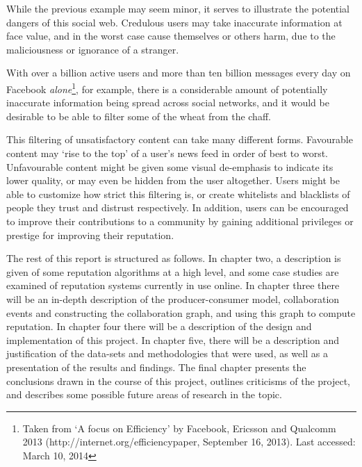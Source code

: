 \documentclass[]{final_report}
\begin{document}
While the previous example may seem minor, it serves to illustrate the potential dangers of this social web. Credulous users may take inaccurate information at face value, and in the worst case cause themselves or others harm, due to the maliciousness or ignorance of a stranger.


With over a billion active users and more than ten billion messages every day on Facebook \textsl{alone}\footnote{Taken from `A focus on Efficiency' by Facebook, Ericsson and Qualcomm 2013 (http://internet.org/efficiencypaper, September 16, 2013). Last accessed: March 10, 2014}, for example, there is a considerable amount of potentially inaccurate information being spread across social networks, and it would be desirable to be able to filter some of the wheat from the chaff.

This filtering of unsatisfactory content can take many different forms. Favourable content may `rise to the top' of a user's news feed in order of best to worst. Unfavourable content might be given some visual de-emphasis to indicate its lower quality, or may even be hidden from the user altogether. Users might be able to customize how strict this filtering is, or create whitelists and blacklists of people they trust and distrust respectively. In addition, users can be encouraged to improve their contributions to a community by gaining additional privileges or prestige for improving their reputation.

The rest of this report is structured as follows. In chapter two, a description is given of some reputation algorithms at a high level, and some case studies are examined of reputation systems currently in use online. In chapter three there will be an in-depth description of the producer-consumer model, collaboration events and constructing the collaboration graph, and using this graph to compute reputation. In chapter four there will be a description of the design and implementation of this project. In chapter five, there will be a description and justification of the data-sets and methodologies that were used, as well as a presentation of the results and findings. The final chapter presents the conclusions drawn in the course of this project, outlines criticisms of the project, and describes some possible future areas of research in the topic.
\end{document}
